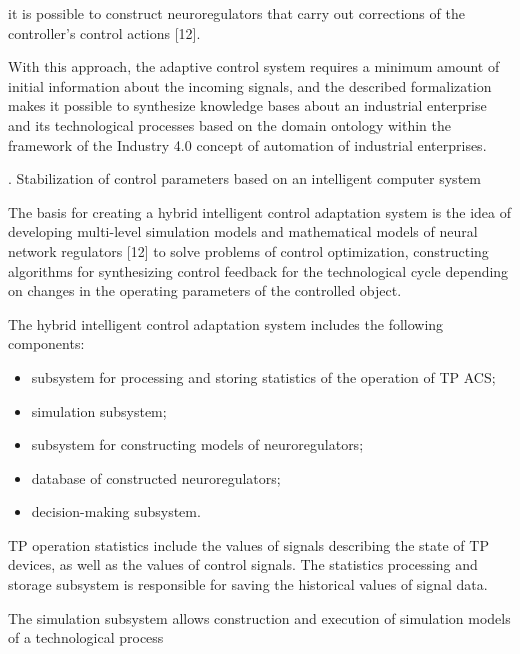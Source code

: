 \documentclass{article}
\newcommand{\RomanNumeralCaps}[1]
    {\MakeUppercase{\romannumeral #1}}
\begin{document}
\begin{multicols}{2}
it is possible to construct neuroregulators that carry out
corrections of the controller’s control actions [12].\par
With this approach, the adaptive control system requires a minimum amount of initial information about
the incoming signals, and the described formalization
makes it possible to synthesize knowledge bases about
an industrial enterprise and its technological processes
based on the domain ontology within the framework
of the Industry 4.0 concept of automation of industrial
enterprises.\vspace{-8pt}
\begin{center}
\RomanNumeralCaps{5.} Stabilization of control parameters based on an
intelligent computer system
\end{center}\vspace{-8pt}\par
The basis for creating a hybrid intelligent control
adaptation system is the idea of developing multi-level
simulation models and mathematical models of neural
network regulators [12] to solve problems of control
optimization, constructing algorithms for synthesizing
control feedback for the technological cycle depending
on changes in the operating parameters of the controlled
object.\par The hybrid intelligent control adaptation system includes the following components:
\begin{itemize}
    \item subsystem for processing and storing statistics of the
operation of TP ACS;\vspace{-8pt}
\item  simulation subsystem;\vspace{-8pt}
\item  subsystem for constructing models of neuroregulators;\vspace{-8pt}
\item database of constructed neuroregulators;\vspace{-8pt}
\item decision-making subsystem.\vspace{-8pt}
\end{itemize}\par TP operation statistics include the values of signals
describing the state of TP devices, as well as the values
of control signals. The statistics processing and storage
subsystem is responsible for saving the historical values
of signal data.\par
The simulation subsystem allows construction and execution of simulation models of a technological process

\end{multicols}
\end{document}
